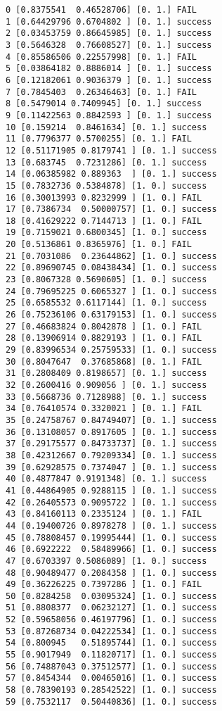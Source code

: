 \documentclass[11pt]{article}
\begin{document}
    \begin{Verbatim}[commandchars=\\\{\}]
0 [0.8375541  0.46528706] [0. 1.] FAIL
1 [0.64429796 0.6704802 ] [0. 1.] success
2 [0.03453759 0.86645985] [0. 1.] success
3 [0.5646328  0.76608527] [0. 1.] success
4 [0.85586506 0.22557998] [0. 1.] FAIL
5 [0.03864182 0.8886014 ] [0. 1.] success
6 [0.12182061 0.9036379 ] [0. 1.] success
7 [0.7845403  0.26346463] [0. 1.] FAIL
8 [0.5479014 0.7409945] [0. 1.] success
9 [0.11422563 0.8842593 ] [0. 1.] success
10 [0.159214  0.8461634] [0. 1.] success
11 [0.7796377 0.5700255] [0. 1.] FAIL
12 [0.51171905 0.8179741 ] [0. 1.] success
13 [0.683745  0.7231286] [0. 1.] success
14 [0.06385982 0.889363  ] [0. 1.] success
15 [0.7832736 0.5384878] [1. 0.] success
16 [0.30013993 0.8232999 ] [1. 0.] FAIL
17 [0.7386734  0.50000757] [1. 0.] success
18 [0.41629222 0.7144713 ] [1. 0.] FAIL
19 [0.7159021 0.6800345] [1. 0.] success
20 [0.5136861 0.8365976] [1. 0.] FAIL
21 [0.7031086  0.23644862] [1. 0.] success
22 [0.89690745 0.08438434] [1. 0.] success
23 [0.8067328 0.5690605] [1. 0.] success
24 [0.79695225 0.6065327 ] [1. 0.] success
25 [0.6585532 0.6117144] [1. 0.] success
26 [0.75236106 0.63179153] [1. 0.] success
27 [0.46683824 0.8042878 ] [1. 0.] FAIL
28 [0.13906914 0.8829193 ] [1. 0.] FAIL
29 [0.83996534 0.25759533] [1. 0.] success
30 [0.8047647  0.37685868] [0. 1.] FAIL
31 [0.2808409 0.8198657] [0. 1.] success
32 [0.2600416 0.909056 ] [0. 1.] success
33 [0.5668736 0.7128988] [0. 1.] success
34 [0.76410574 0.3320021 ] [0. 1.] FAIL
35 [0.24758767 0.84749407] [0. 1.] success
36 [0.13108057 0.8917605 ] [0. 1.] success
37 [0.29175577 0.84733737] [0. 1.] success
38 [0.42312667 0.79209334] [0. 1.] success
39 [0.62928575 0.7374047 ] [0. 1.] success
40 [0.4877847 0.9191348] [0. 1.] success
41 [0.44864905 0.9288115 ] [0. 1.] success
42 [0.26405573 0.9095722 ] [0. 1.] success
43 [0.84160113 0.2335124 ] [0. 1.] FAIL
44 [0.19400726 0.8978278 ] [0. 1.] success
45 [0.78808457 0.19995444] [1. 0.] success
46 [0.6922222  0.58489966] [1. 0.] success
47 [0.6703397 0.5086089] [1. 0.] success
48 [0.90489477 0.2084358 ] [1. 0.] success
49 [0.36226225 0.7397286 ] [1. 0.] FAIL
50 [0.8284258  0.03095324] [1. 0.] success
51 [0.8808377  0.06232127] [1. 0.] success
52 [0.59658056 0.46197796] [1. 0.] success
53 [0.87268734 0.04222534] [1. 0.] success
54 [0.800945   0.51895744] [1. 0.] success
55 [0.9017949  0.11820717] [1. 0.] success
56 [0.74887043 0.37512577] [1. 0.] success
57 [0.8454344  0.00465016] [1. 0.] success
58 [0.78390193 0.28542522] [1. 0.] success
59 [0.7532117  0.50440836] [1. 0.] success

\end{Verbatim}
\end{document}
